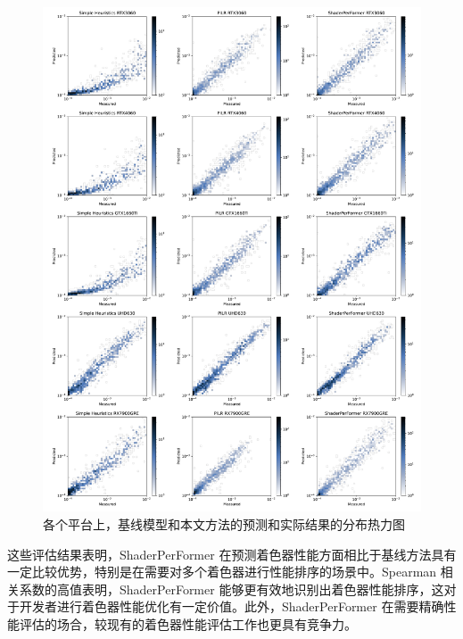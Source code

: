 \begin{figure}[htbp]
  \centering
  \includegraphics[width=1.0\linewidth]{figures/archHeatmapRefined.pdf}
  \caption{各个平台上，基线模型和本文方法的预测和实际结果的分布热力图}
  \label{fig:archHeatmap}
\end{figure}

这些评估结果表明，ShaderPerFormer 在预测着色器性能方面相比于基线方法具有一定比较优势，特别是在需要对多个着色器进行性能排序的场景中。Spearman 相关系数的高值表明，ShaderPerFormer 能够更有效地识别出着色器性能排序，这对于开发者进行着色器性能优化有一定价值。此外，ShaderPerFormer 在需要精确性能评估的场合，较现有的着色器性能评估工作也更具有竞争力。

